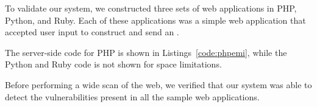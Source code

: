 To validate our system, we constructed three sets of web applications in PHP, Python, and Ruby. Each of these applications was a simple web application that accepted user input to construct and send an \Email.

The server-side code for PHP is shown in Listings~\ref{code:phpemi},
while the Python and Ruby code is not shown for space limitations.


Before performing a wide scan of the web, we verified that our system was able to detect the \ehi vulnerabilities present in all the sample web applications. 



%


